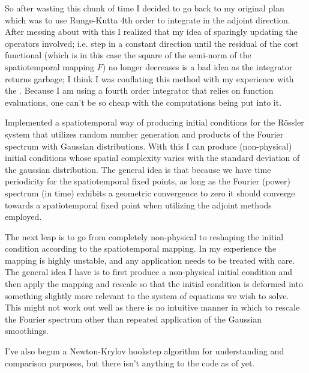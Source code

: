\begin{description}
{\begin{description}
So after wasting this chunk of time I decided to go back to my original plan which was to use Runge-Kutta
4th order to integrate in the adjoint direction. After messing about with this I realized that my idea
of sparingly updating the operators involved; i.e. step in a constant direction until the residual
of the cost functional (which is in this case the square of the semi-norm of the spatiotemporal mapping $F$)
no longer decreases is a bad idea as the integrator returns garbage; I think I was conflating this method
with my experience with the {\descent}. Because I am using a fourth order integrator that relies on
function evaluations, one can't be so cheap with the computations being put into it.

\item[spatiotemporal initial conditions]
Implemented a spatiotemporal way of producing initial conditions for the R\"ossler system that utilizes
random number generation and products of the Fourier spectrum with Gaussian distributions. With this I can produce
(non-physical) initial conditions whose spatial complexity varies with the standard deviation
of the gaussian distribution. The general idea is that because we have time periodicity for the spatiotemporal
fixed points, as long as the Fourier (power) spectrum (in time) exhibits a geometric convergence to zero it
should converge towards a spatiotemporal fixed point when utilizing the adjoint methods employed.

The next leap is to go from completely non-physical to reshaping the initial condition according to the
spatiotemporal mapping. In my experience the mapping is highly unstable, and any
application needs to be treated with care. The general idea I have is to first produce a non-physical
initial condition and then apply the mapping and rescale so that the initial condition is deformed into
something slightly more relevant to the system of equations we wish to solve. This might not work out
well as there is no intuitive manner in which to rescale the Fourier spectrum other than repeated
application of the Gaussian smoothings.

\item[Newton-Krylov hookstep]
I've also begun a Newton-Krylov hookstep algorithm for understanding and comparison purposes, but there isn't
anything to the code as of yet.
\end{description}
}



\end{description}
